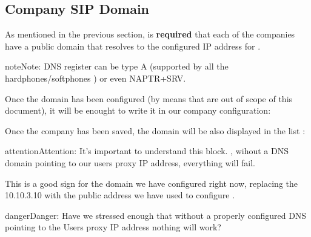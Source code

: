 \documentclass[letterpaper,10pt,english]{sphinxmanual}
\begin{document}
\subsection{Company SIP Domain}
\label{getting_started/internal_calls/brand_portal:company-sip-domain}\label{getting_started/internal_calls/brand_portal:domain-per-company}
As mentioned in the previous section, is \textbf{required} that each of the companies
have a public domain that resolves to the configured IP address for
{\hyperref[platform/proxy_users:proxyusers]{}}.

\begin{notice}{note}{Note:}
DNS register can be type A (supported by all the hardphones/softphones
) or even NAPTR+SRV.
\end{notice}

Once the domain has been configured (by means that are out of scope of this
document), it will be enought to write it in our company configuration:

\noindent{}

Once the company has been saved, the domain will be also displayed in the list
{\hyperref[platform/domains:god\string-sipdomains]{}}:

\noindent{}

\begin{notice}{attention}{Attention:}
It's important to understand this block. {\hyperref[getting_started/internal_calls/brand_portal:dnshack]{}}, wihout a DNS domain pointing to our
users proxy IP address, everything will fail.
\end{notice}

This is a good sign for the domain we have configured right now, replacing the
10.10.3.10 with the public address we have used to configure {\hyperref[platform/proxy_users:proxyusers]{}}.

\noindent{}

\begin{notice}{danger}{Danger:}
Have we stressed enough that without a properly configured DNS
pointing to the Users proxy IP address nothing will work?
\end{notice}
\end{document}
